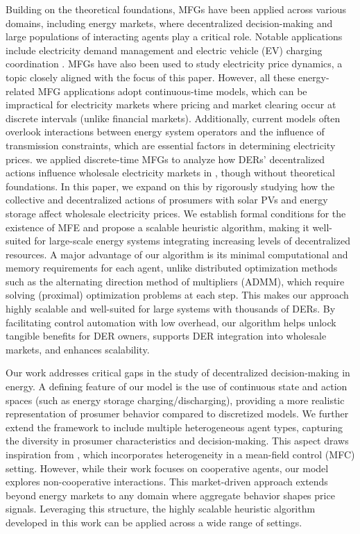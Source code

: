 \documentclass{article}
\theoremstyle{definition}
\theoremstyle{plain}
\begin{document}
Building on the theoretical foundations, MFGs have been applied across various domains, including energy markets, where decentralized decision-making and large populations of interacting agents play a critical role. Notable applications include electricity demand management \citep{MFG_DM} and electric vehicle (EV) charging coordination \citep{MFG_EV1, MFG_EV2}. MFGs have also been used to study electricity price dynamics, a topic closely aligned with the focus of this paper. However, all these energy-related MFG applications adopt continuous-time models, which can be impractical for electricity markets where pricing and market clearing occur at discrete intervals (unlike financial markets). Additionally, current models often overlook interactions between energy system operators and the influence of transmission constraints, which are essential factors in determining electricity prices.  we applied discrete-time MFGs to analyze how DERs' decentralized actions influence wholesale electricity markets in \cite{HeLiu24}, though without theoretical foundations.  In this paper, we expand on this by rigorously studying how the collective and decentralized actions of prosumers with solar PVs and energy storage affect wholesale electricity prices. We establish formal conditions for the existence of MFE and propose a scalable heuristic algorithm, making it well-suited for large-scale energy systems integrating increasing levels of decentralized resources. A major advantage of our algorithm is its minimal computational and memory requirements for each agent, unlike distributed optimization methods such as the alternating direction method of multipliers (ADMM), which require solving (proximal) optimization problems at each step. This makes our approach highly scalable and well-suited for large systems with thousands of DERs. By facilitating control automation with low overhead, our algorithm helps unlock tangible benefits for DER owners, supports DER integration into wholesale markets, and enhances scalability. 

Our work addresses critical gaps in the study of decentralized decision-making in energy. A defining feature of our model is the use of continuous state and action spaces (such as energy storage charging/discharging), providing a more realistic representation of prosumer behavior compared to discretized models. We further extend the framework to include multiple heterogeneous agent types, capturing the diversity in prosumer characteristics and decision-making. This aspect draws inspiration from \cite{mondal2022approximation}, which incorporates heterogeneity in a mean-field control (MFC) setting. However, while their work focuses on cooperative agents, our model explores non-cooperative interactions. This market-driven approach extends beyond energy markets to any domain where aggregate behavior shapes price signals. Leveraging this structure, the highly scalable heuristic algorithm developed in this work can be applied across a wide range of settings.
\end{document}
